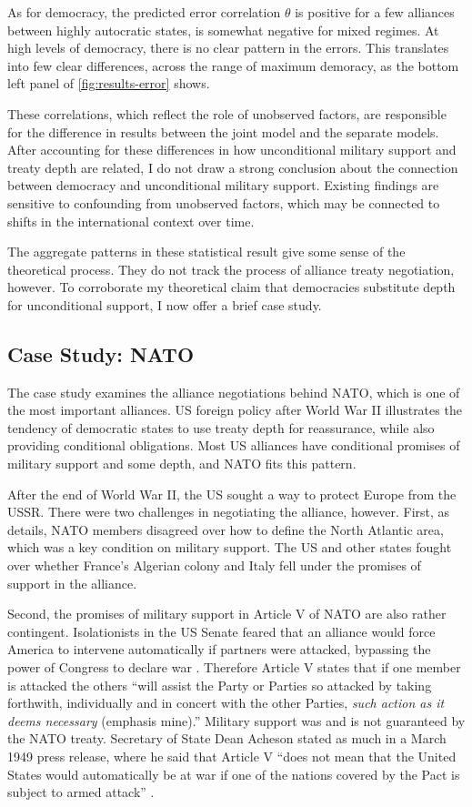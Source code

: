 \documentclass[12pt]{article}
\begin{document}
As for democracy, the predicted error correlation $\theta$ is positive for a few alliances between highly autocratic states, is somewhat negative for mixed regimes.
At high levels of democracy, there is no clear pattern in the errors. 
This translates into few clear differences, across the range of maximum demoracy, as the bottom left panel of \autoref{fig:results-error} shows. 


These correlations, which reflect the role of unobserved factors, are responsible for the difference in results between the joint model and the separate models. 
After accounting for these differences in how unconditional military support and treaty depth are related, I do not draw a strong conclusion about the connection between democracy and unconditional military support. 
Existing findings are sensitive to confounding from unobserved factors, which may be connected to shifts in the international context over time. 
 

The aggregate patterns in these statistical result give some sense of the theoretical process. 
They do not track the process of alliance treaty negotiation, however. 
To corroborate my theoretical claim that democracies substitute depth for unconditional support, I now offer a brief case study. 


\subsection{Case Study: NATO}


The case study examines the alliance negotiations behind NATO, which is one of the most important alliances.
US foreign policy after World War II illustrates the tendency of democratic states to use treaty depth for reassurance, while also providing conditional obligations.  
Most US alliances have conditional promises of military support and some depth, and NATO fits this pattern. 


After the end of World War II, the US sought a way to protect Europe from the USSR. 
There were two challenges in negotiating the alliance, however.
First, as \citet{Poast2019a} details, NATO members disagreed over how to define the North Atlantic area, which was a key condition on military support. 
The US and other states fought over whether France's Algerian colony and Italy fell under the promises of support in the alliance. 


Second, the promises of military support in Article V of NATO are also rather contingent. 
Isolationists in the US Senate feared that an alliance would force America to intervene automatically if partners were attacked, bypassing the power of Congress to declare war \citep[pg. 280-1]{Acheson1969}.
Therefore Article V states that if one member is attacked the others ``will assist the Party or Parties so attacked by taking forthwith, individually and in concert with the other Parties, \emph{such action as it deems necessary} (emphasis mine).'' 
Military support was and is not guaranteed by the NATO treaty. 
Secretary of State Dean Acheson stated as much in a March 1949 press release, where he said that Article V ``does not mean that the United States would automatically be at war if one of the nations covered by the Pact is subject to armed attack'' \citep{Acheson1949}. 
\end{document}
